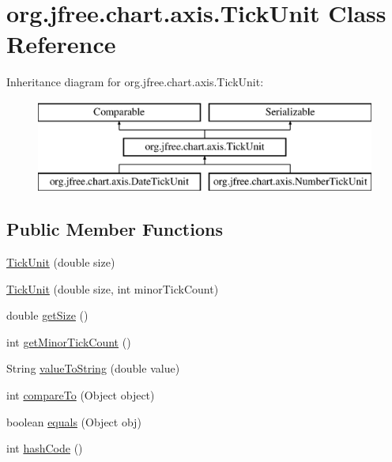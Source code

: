 \hypertarget{classorg_1_1jfree_1_1chart_1_1axis_1_1_tick_unit}{}\section{org.\+jfree.\+chart.\+axis.\+Tick\+Unit Class Reference}
\label{classorg_1_1jfree_1_1chart_1_1axis_1_1_tick_unit}
Inheritance diagram for org.\+jfree.\+chart.\+axis.\+Tick\+Unit\+:\begin{figure}[H]
\begin{center}
\leavevmode
\includegraphics[height=3.000000cm]{classorg_1_1jfree_1_1chart_1_1axis_1_1_tick_unit}
\end{center}
\end{figure}
\subsection*{Public Member Functions}
\begin{DoxyCompactItemize}
\item 
\mbox{\hyperlink{classorg_1_1jfree_1_1chart_1_1axis_1_1_tick_unit_a522e33e366d5ab9c1fbef59e9f3c0739}{Tick\+Unit}} (double size)
\item 
\mbox{\hyperlink{classorg_1_1jfree_1_1chart_1_1axis_1_1_tick_unit_a5c321f74b766b72190be386d3542e788}{Tick\+Unit}} (double size, int minor\+Tick\+Count)
\item 
double \mbox{\hyperlink{classorg_1_1jfree_1_1chart_1_1axis_1_1_tick_unit_aea808587f970ef1374d35b9a36358d2b}{get\+Size}} ()
\item 
int \mbox{\hyperlink{classorg_1_1jfree_1_1chart_1_1axis_1_1_tick_unit_ad9225c99e3a579eef24640709ed41547}{get\+Minor\+Tick\+Count}} ()
\item 
String \mbox{\hyperlink{classorg_1_1jfree_1_1chart_1_1axis_1_1_tick_unit_ac3020741bd6fe238ffc01a19ad0351c6}{value\+To\+String}} (double value)
\item 
int \mbox{\hyperlink{classorg_1_1jfree_1_1chart_1_1axis_1_1_tick_unit_a544d66ed4908ad6b77e70029a8d1fc64}{compare\+To}} (Object object)
\item 
boolean \mbox{\hyperlink{classorg_1_1jfree_1_1chart_1_1axis_1_1_tick_unit_a27b0b5ec6b177c5285fa4da3f642ede2}{equals}} (Object obj)
\item 
int \mbox{\hyperlink{classorg_1_1jfree_1_1chart_1_1axis_1_1_tick_unit_a3264720f7f7a9e706699b529be4a0ced}{hash\+Code}} ()
\end{DoxyCompactItemize}


